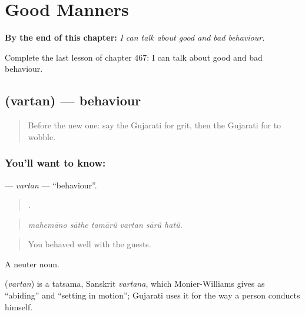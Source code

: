 
\chapter{Good Manners}
\label{ch:gu-good-manners}

\begin{chapteropening}
\textbf{By the end of this chapter:} \emph{I can talk about good and bad behaviour.}

Complete the last lesson of chapter 467: I can talk about good and bad behaviour.
\end{chapteropening}

\section[\texorpdfstring{\gu{વર્તન} (vartan)}{વર્તન (vartan)}]{ (vartan) — behaviour}

\label{lesson:GU-C467-vartan}



\begin{quote}
Before the new one: say the Gujarati for grit, then the Gujarati for to wobble.
\end{quote}

\subsection*{You'll want to know: }
\textbf{} — \emph{vartan} — \textquotedblleft{}behaviour\textquotedblright{}.

\begin{quote}
     .
\end{quote}

\begin{quote}
\emph{mahemāno sāthe tamārũ vartan sārũ hatũ.}
\end{quote}

\begin{quote}
You behaved well with the guests.
\end{quote}

A neuter noun.

\begin{cousinweb}
\textbf{} (\emph{vartan}) is a tatsama, Sanskrit \emph{vartana}, which Monier-Williams gives as \textquotedblleft{}abiding\textquotedblright{} and \textquotedblleft{}setting in motion\textquotedblright{}; Gujarati uses it for the way a person conducts himself.
\end{cousinweb}

